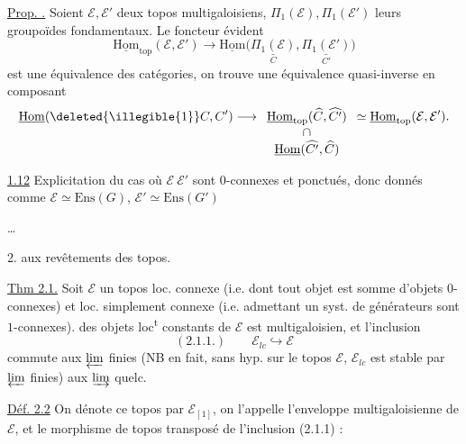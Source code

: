 
\uline{Prop. .} Soient $\mathcal E,\mathcal E'$ deux topos multigaloisiens, $\Pi_1(\mathcal E),\Pi_1(\mathcal E')$ leurs groupoïdes fondamentaux. Le foncteur évident
\[
\underline{\mathrm{Hom}}_{\mathrm{top}}(\mathcal E,\mathcal E')
\longrightarrow
\underline{\mathrm{Hom}}\bigl(
\underset{C}{\underline{\Pi_1(\mathcal E)}},
\underset{C'}{\underline{\Pi_1(\mathcal E')}}\bigr)
\]
est une équivalence des catégories, on trouve une équivalence quasi-inverse en composant
\[
\underline{\mathrm{Hom}}(\deleted{\illegible{1}}C,C')
\longrightarrow
\begin{array}[t]{c}
\underline{\mathrm{Hom}}_{\mathrm{top}}(\widehat C,\widehat {C'})\\
\cap\\
\underline{\mathrm{Hom}}(\widehat {C'},\widehat C)
\end{array}
\simeq
\underline{\mathrm{Hom}}_{\mathrm{top}}(\mathcal E,\mathcal E').
\]

\uline{1.12} Explicitation du cas où $\mathcal E\ \mathcal E'$ sont $0$-connexes et ponctués, donc donnés comme $\mathcal E\simeq\mathrm{Ens}(G)$, $\mathcal E'\simeq\mathrm{Ens}(G')$

\dots



2.  aux revêtements des topos.

\uline{Thm 2.1.} Soit $\mathcal E$ un topos loc. connexe (i.e. dont tout objet est somme d'objets $0$-connexes) et loc. simplement connexe (i.e. admettant un syst. de générateurs  sont $1$-connexes).
 des objets loc\textsuperscript{t} constants de $\mathcal E$ est  multigaloisien, et l'inclusion
\[
(2.1.1.)\qquad \mathcal E_{lc}\hookrightarrow\mathcal E
\]
commute aux $\varprojlim$ finies (NB en fait, sans hyp. sur le topos $\mathcal E$, $\mathcal E_{lc}$ est stable par $\varprojlim$ finies)  aux $\varinjlim$ quelc.

\uline{Déf. 2.2} On dénote ce topos par $\mathcal E_{[1]}$, on l'appelle l'enveloppe multigaloisienne de $\mathcal E$, et le morphisme de topos transposé de l'inclusion (2.1.1) :

